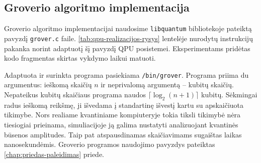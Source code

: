 \subsection{Groverio algoritmo implementacija}
\label{chap:groverio-implementacija}

Groverio algoritmo implementacijai naudosime \texttt{libquantum} bibliotekoje pateiktą pavyzdį \texttt{grover.c} faile. \ref{tab:qpu-realizacijos-rysys} lentelėje nurodytų instrukcijų pakanka norint adaptuotį šį pavyzdį QPU posistemei. Eksperimentams pridėtas kodo fragmentas skirtas vykdymo laikui matuoti.

Adaptuota ir surinkta programa pasiekiama \texttt{/bin/grover}. Programa priima du argumentus: ieškomą skaičių $n$ ir neprivalomą argumentą -- kubitų skaičių. Nepateikus kubitų skaičiaus programa
\linebreak
naudos $ \lceil \log_2(n+1) \rceil $ kubitų. Sėkmingai radus ieškomą reikšmę, ji išvedama į standartinę išvestį kartu su apskaičiuota tikimybe. Nors realiame kvantiniame kompiuteryje tokia tiksli tikimybė nėra tiesiogiai prieinama, simuliacijoje ją galima nustatyti analizuojant kvantinės būsenos amplitudes. Taip pat atspausdinamas skaičiavimams sugaištas laikas nanosekundėmis. Groverio programos naudojimo pavyzdys pateiktas \ref{chap:priedas-paleidimas} priede.
